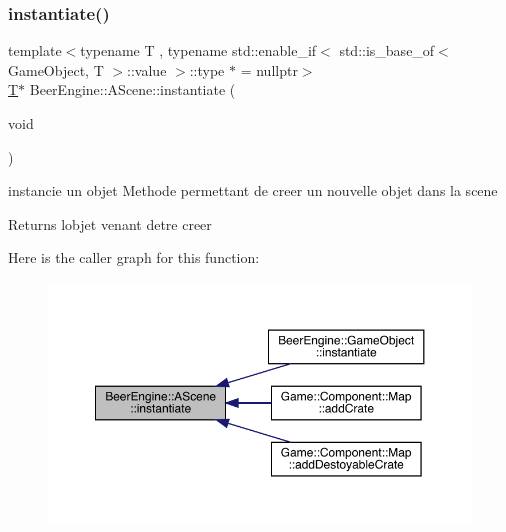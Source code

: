\subsubsection{\texorpdfstring{instantiate()}{instantiate()}\hspace{0.1cm}{\footnotesize\ttfamily [1/2]}}
{\footnotesize\ttfamily template$<$typename T , typename std\+::enable\+\_\+if$<$ std\+::is\+\_\+base\+\_\+of$<$ Game\+Object, T $>$\+::value $>$\+::type $\ast$  = nullptr$>$ \\
\mbox{\hyperlink{namespace_beer_engine_a94f0b552f6dc910de8cdb44207981f53a8de48e594408f9fc561b2f68ce05f664}{T}}$\ast$ Beer\+Engine\+::\+A\+Scene\+::instantiate (\begin{DoxyParamCaption}\item[{void}]{ }\end{DoxyParamCaption})\hspace{0.3cm}{\ttfamily [inline]}}



instancie un objet Methode permettant de creer un nouvelle objet dans la scene 

\begin{DoxyReturn}{Returns}
l\textquotesingle{}objet venant d\textquotesingle{}etre creer 
\end{DoxyReturn}
Here is the caller graph for this function\+:\nopagebreak
\begin{figure}[H]
\begin{center}
\leavevmode
\includegraphics[width=350pt]{class_beer_engine_1_1_a_scene_a2bd087ae22796d1e286c867f4f1ecc38_icgraph}
\end{center}
\end{figure}
\mbox{\label{class_beer_engine_1_1_a_scene_acf89d3198589c3e3007b0bc0579dd9ab}} 

